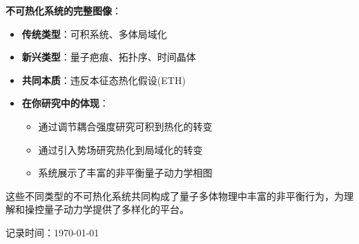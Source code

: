 \documentclass[11pt,a4paper]{article}
\begin{document}
\textbf{不可热化系统的完整图像}：

\begin{itemize}
    \item \textbf{传统类型}：可积系统、多体局域化
    \item \textbf{新兴类型}：量子疤痕、拓扑序、时间晶体
    \item \textbf{共同本质}：违反本征态热化假设(ETH)
    \item \textbf{在你研究中的体现}：
    \begin{itemize}
        \item 通过调节耦合强度研究可积到热化的转变
        \item 通过引入势场研究热化到局域化的转变
        \item 系统展示了丰富的非平衡量子动力学相图
    \end{itemize}
\end{itemize}

这些不同类型的不可热化系统共同构成了量子多体物理中丰富的非平衡行为，为理解和操控量子动力学提供了多样化的平台。


\vfill
{\small 记录时间：\today\ \currenttime}
\end{document}
